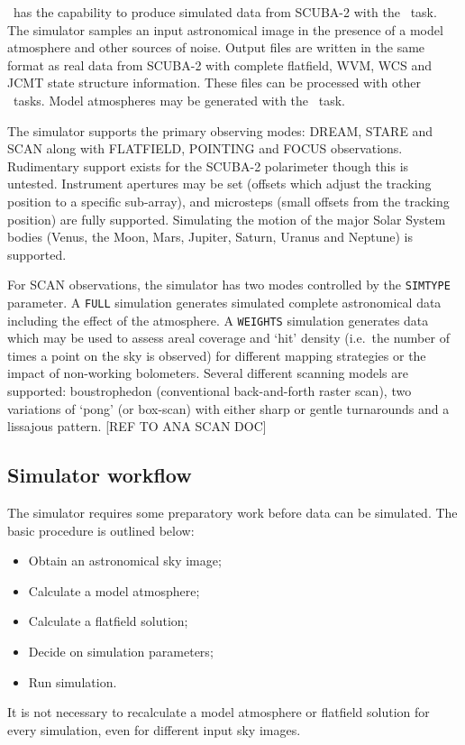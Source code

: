 \documentclass[oneside,11pt]{starlink}
\begin{document}
\SMURF\ has the capability to produce simulated data from SCUBA-2 with
the \sctwosim\ task. The simulator samples an input astronomical image
in the presence of a model atmosphere and other sources of noise.
Output files are written in the same format as real data from SCUBA-2
with complete flatfield, WVM, WCS and JCMT state structure
information. These files can be processed with other \SMURF\
tasks. Model atmospheres may be generated with the \skynoise\ task.

The simulator supports the primary observing modes: DREAM, STARE and
SCAN along with FLATFIELD, POINTING and FOCUS
observations. Rudimentary support exists for the SCUBA-2 polarimeter
though this is untested. Instrument apertures may be set (offsets
which adjust the tracking position to a specific sub-array), and
microsteps (small offsets from the tracking position) are fully
supported. Simulating the motion of the major Solar System bodies
(Venus, the Moon, Mars, Jupiter, Saturn, Uranus and Neptune) is
supported.

For SCAN observations, the simulator has two modes controlled by the
\texttt{SIMTYPE} parameter. A \texttt{FULL} simulation generates
simulated complete astronomical data including the effect of the
atmosphere. A \texttt{WEIGHTS} simulation generates data which may be
used to assess areal coverage and `hit' density (i.e.\ the number of
times a point on the sky is observed) for different mapping strategies
or the impact of non-working bolometers. Several different scanning
models are supported: boustrophedon (conventional back-and-forth
raster scan), two variations of `pong' (or box-scan) with either
sharp or gentle turnarounds and a lissajous pattern. [REF TO ANA SCAN DOC]

\subsection{Simulator workflow\label{se:simuse}}

The simulator requires some preparatory work before data can be
simulated. The basic procedure is outlined below:
\begin{itemize}
\item Obtain an astronomical sky image;
\item Calculate a model atmosphere;
\item Calculate a flatfield solution;
\item Decide on simulation parameters;
\item Run simulation.
\end{itemize}
It is not necessary to recalculate a model atmosphere or flatfield
solution for every simulation, even for different input sky images.
\end{document}
